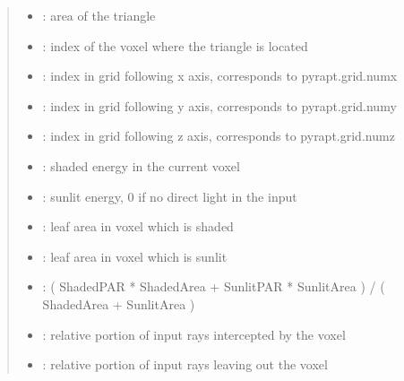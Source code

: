 \documentclass[letterpaper,10pt,english]{sphinxmanual}
\begin{document}
\begin{quote}
\begin{itemize}
\item {} 
\sphinxAtStartPar
{}: area of the triangle

\item {} 
\sphinxAtStartPar
{}: index of the voxel where the triangle is located

\item {} 
\sphinxAtStartPar
{}: index in grid following x axis, corresponds to pyrapt.grid.numx

\item {} 
\sphinxAtStartPar
{}: index in grid following y axis, corresponds to pyrapt.grid.numy

\item {} 
\sphinxAtStartPar
{}: index in grid following z axis, corresponds to pyrapt.grid.numz

\item {} 
\sphinxAtStartPar
{}: shaded energy in the current voxel

\item {} 
\sphinxAtStartPar
{}: sunlit energy, 0 if no direct light in the input

\item {} 
\sphinxAtStartPar
{}: leaf area in voxel which is shaded

\item {} 
\sphinxAtStartPar
{}: leaf area in voxel which is sunlit

\item {} 
\sphinxAtStartPar
{}: ( ShadedPAR * ShadedArea + SunlitPAR * SunlitArea ) / ( ShadedArea + SunlitArea )

\item {} 
\sphinxAtStartPar
{}: relative portion of input rays intercepted by the voxel

\item {} 
\sphinxAtStartPar
{}: relative portion of input rays leaving out the voxel

\end{itemize}
\end{quote}
\end{document}
